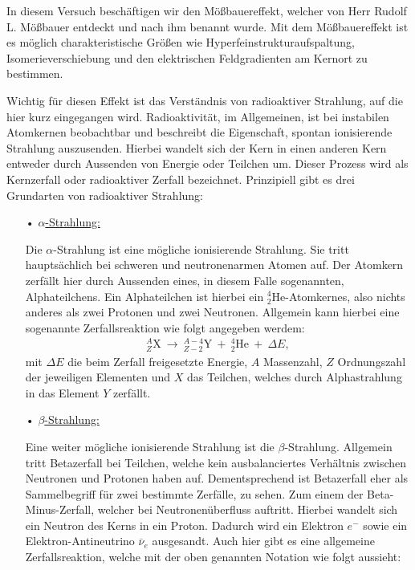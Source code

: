 \documentclass[10pt,twoside]{article}
\newcommand{\nach}{\longrightarrow}
\renewcommand{\bar}{\overline}
\renewcommand{\1}{^{-1}}
\renewcommand{\2}{^{-2}}
\newcommand{\3}{^{-3}}
\newcommand{\4}{^{-4}}
\newcommand{\5}{^{-5}}
\newcommand{\6}{^{-6}}
\newcommand{\7}{^{-7}}
\newcommand{\8}{^{-8}}
\newcommand{\9}{^{-9}}
\begin{document}
In diesem Versuch beschäftigen wir den Mößbauereffekt, 
welcher von Herr Rudolf L. Mößbauer entdeckt 
und nach ihm benannt wurde. 
Mit dem Mößbauereffekt ist es möglich charakteristische Größen wie Hyperfeinstrukturaufspaltung, Isomerieverschiebung und den elektrischen Feldgradienten am Kernort zu bestimmen.\par 
Wichtig für diesen Effekt ist das Verständnis von radioaktiver Strahlung, auf die hier kurz eingegangen wird. 
Radioaktivität, im Allgemeinen, 
ist bei instabilen Atomkernen beobachtbar und beschreibt die Eigenschaft, 
spontan ionisierende Strahlung auszusenden. 
Hierbei wandelt sich der Kern in einen anderen Kern entweder durch Aussenden von Energie oder Teilchen um. Dieser Prozess wird als Kernzerfall oder radioaktiver Zerfall bezeichnet.
Prinzipiell gibt es drei Grundarten von radioaktiver Strahlung:
\begin{enumerate}[itemsep=0pt]
\item[•]  \underline{$\alpha$-Strahlung:} \par 
Die $\alpha$-Strahlung ist eine mögliche ionisierende Strahlung. 
Sie tritt hauptsächlich bei schweren und neutronenarmen Atomen auf.
Der Atomkern zerfällt hier durch Aussenden eines, 
in diesem Falle sogenannten, Alphateilchens. 
Ein Alphateilchen ist hierbei ein $^4_2\text{He}$-Atomkernes, 
also nichts anderes als zwei Protonen und zwei Neutronen. 
Allgemein kann hierbei eine sogenannte Zerfallsreaktion wie folgt angegeben werdem:
\begin{align*}
^{A}_{Z}\text{X} ~ \nach ~ ^{A-4}_{Z-2}\text{Y} ~+~ ^4_2\text{He} ~+~\Delta E{,}
\end{align*} 
mit $\Delta E$ die beim Zerfall freigesetzte Energie, $A$ Massenzahl, $Z$ Ordnungszahl der jeweiligen Elementen und $X$ das Teilchen, welches durch Alphastrahlung in das Element $Y$ zerfällt. 
\item[•] \underline{$\beta$-Strahlung:} \par  
Eine weiter mögliche ionisierende Strahlung ist die $\beta$-Strahlung. 
Allgemein tritt Betazerfall bei Teilchen, 
welche kein ausbalanciertes Verhältnis zwischen Neutronen und Protonen haben auf. 
Dementsprechend ist Betazerfall eher als Sammelbegriff für zwei bestimmte Zerfälle, zu sehen. 
Zum einem der Beta-Minus-Zerfall, 
welcher bei Neutronenüberfluss auftritt. 
Hierbei wandelt sich ein Neutron des Kerns in ein Proton.
Dadurch wird ein Elektron $e^-$ sowie ein Elektron-Antineutrino $\bar{\nu}_e$ ausgesandt. Auch hier gibt es eine allgemeine Zerfallsreaktion, welche mit der oben genannten Notation wie folgt aussieht:

\end{enumerate}
\end{document}
